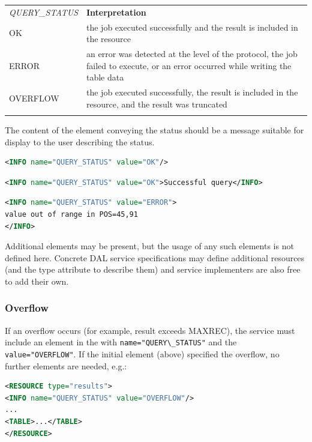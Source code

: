 \documentclass[11pt,letter]{ivoa}
\begin{document}
\begin{tabular}{l p{8cm}}
\sptablerule
\emph{QUERY\_STATUS}&\textbf{Interpretation}\\
\sptablerule
OK & the job executed successfully and the result is included in the resource \\
ERROR & an error was detected at the level of the protocol, the job failed to
execute, or an error occurred while writing the table data \\
OVERFLOW & the job executed successfully, the result is included in the
resource, and the result was truncated \\
\sptablerule
\label{tab:query-status}
\end{tabular}

The content of the  element conveying the status should be a message
suitable for display to the user describing the status.

\begin{lstlisting}[language=XML]
<INFO name="QUERY_STATUS" value="OK"/>
\end{lstlisting}

\begin{lstlisting}[language=XML]
<INFO name="QUERY_STATUS" value="OK">Successful query</INFO>
\end{lstlisting}

\begin{lstlisting}[language=XML]
<INFO name="QUERY_STATUS" value="ERROR">
value out of range in POS=45,91
</INFO>
\end{lstlisting}

Additional  elements may be present, but the usage of any such elements
is not defined here. Concrete DAL service specifications may define additional
resources (and the type attribute to describe them) and service implementers are
also free to add their own.

\subsubsection{Overflow}
\label{sec:response-overflow}
If an overflow occurs (for example, result exceeds MAXREC), the service must include an
element in the  with \verb|name="QUERY\_STATUS"| and the
\verb|value="OVERFLOW"|. If
the initial  element (above) specified the overflow, no further elements are
needed, e.g.:

\begin{lstlisting}[language=XML]
<RESOURCE type="results">
<INFO name="QUERY_STATUS" value="OVERFLOW"/>
...
<TABLE>...</TABLE>
</RESOURCE>
\end{lstlisting}
\end{document}
